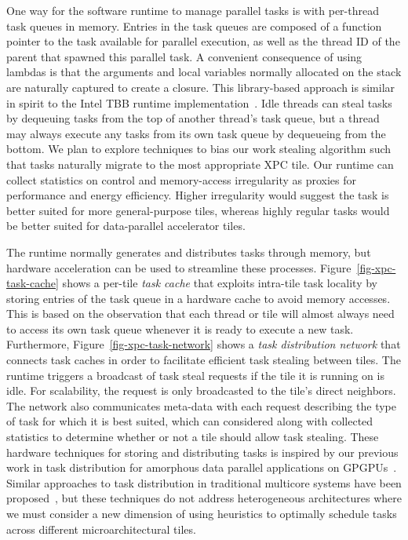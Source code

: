One way for the software runtime to manage parallel tasks is with
per-thread task queues in memory. Entries in the task queues are composed
of a function pointer to the task available for parallel execution, as
well as the thread ID of the parent that spawned this parallel task. A
convenient consequence of using lambdas is that the arguments and local
variables normally allocated on the stack are naturally captured to
create a closure. This library-based approach is similar in spirit to the
Intel TBB runtime implementation~\cite{reinders-tbb-book2007}. Idle
threads can steal tasks by dequeuing tasks from the top of another
thread's task queue, but a thread may always execute any tasks from its
own task queue by dequeueing from the bottom. We plan to explore
techniques to bias our work stealing algorithm such that tasks naturally
migrate to the most appropriate XPC tile. Our runtime can collect
statistics on control and memory-access irregularity as proxies for
performance and energy efficiency. Higher irregularity would suggest the
task is better suited for more general-purpose tiles, whereas highly
regular tasks would be better suited for data-parallel accelerator tiles.

The runtime normally generates and distributes tasks through memory, but
hardware acceleration can be used to streamline these
processes. Figure~\ref{fig-xpc-task-cache} shows a per-tile \emph{task
  cache} that exploits intra-tile task locality by storing entries of the
task queue in a hardware cache to avoid memory accesses. This is based on
the observation that each thread or tile will almost always need to
access its own task queue whenever it is ready to execute a new
task. Furthermore, Figure~\ref{fig-xpc-task-network} shows a \emph{task
  distribution network} that connects task caches in order to facilitate
efficient task stealing between tiles. The runtime triggers a broadcast
of task steal requests if the tile it is running on is idle.  For
scalability, the request is only broadcasted to the tile's direct
neighbors. The network also communicates meta-data with each request
describing the type of task for which it is best suited, which can
considered along with collected statistics to determine whether or not a
tile should allow task stealing. These hardware techniques for storing
and distributing tasks is inspired by our previous work in task
distribution for amorphous data parallel applications on
GPGPUs~\cite{kim-hwwl-micro2014}. Similar approaches to task distribution
in traditional multicore systems have been
proposed~\cite{kumar-carbon-isca2007,sanchez-adm-asplos2010}, but these
techniques do not address heterogeneous architectures where we must
consider a new dimension of using heuristics to optimally schedule tasks
across different microarchitectural tiles.
